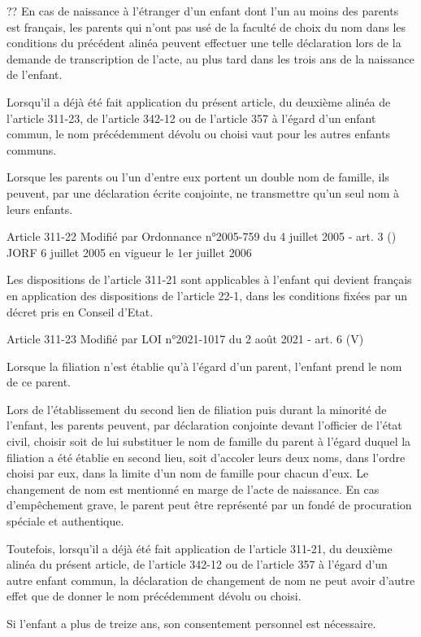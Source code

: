 \documentclass[
  12pt,
]{book}
\begin{document}
\begin{encadre}{??}
En cas de naissance à l'étranger d'un enfant dont l'un au moins des parents est français, les parents qui n'ont pas usé de la faculté de choix du nom dans les conditions du précédent alinéa peuvent effectuer une telle déclaration lors de la demande de transcription de l'acte, au plus tard dans les trois ans de la naissance de l'enfant.

Lorsqu'il a déjà été fait application du présent article, du deuxième alinéa de l'article 311-23, de l'article 342-12 ou de l'article 357 à l'égard d'un enfant commun, le nom précédemment dévolu ou choisi vaut pour les autres enfants communs.

Lorsque les parents ou l'un d'entre eux portent un double nom de famille, ils peuvent, par une déclaration écrite conjointe, ne transmettre qu'un seul nom à leurs enfants.

Article 311-22
Modifié par Ordonnance n°2005-759 du 4 juillet 2005 - art. 3 () JORF 6 juillet 2005 en vigueur le 1er juillet 2006

Les dispositions de l'article 311-21 sont applicables à l'enfant qui devient français en application des dispositions de l'article 22-1, dans les conditions fixées par un décret pris en Conseil d'Etat.

Article 311-23
Modifié par LOI n°2021-1017 du 2 août 2021 - art. 6 (V)

Lorsque la filiation n'est établie qu'à l'égard d'un parent, l'enfant prend le nom de ce parent.

Lors de l'établissement du second lien de filiation puis durant la minorité de l'enfant, les parents peuvent, par déclaration conjointe devant l'officier de l'état civil, choisir soit de lui substituer le nom de famille du parent à l'égard duquel la filiation a été établie en second lieu, soit d'accoler leurs deux noms, dans l'ordre choisi par eux, dans la limite d'un nom de famille pour chacun d'eux. Le changement de nom est mentionné en marge de l'acte de naissance. En cas d'empêchement grave, le parent peut être représenté par un fondé de procuration spéciale et authentique.

Toutefois, lorsqu'il a déjà été fait application de l'article 311-21, du deuxième alinéa du présent article, de l'article 342-12 ou de l'article 357 à l'égard d'un autre enfant commun, la déclaration de changement de nom ne peut avoir d'autre effet que de donner le nom précédemment dévolu ou choisi.

Si l'enfant a plus de treize ans, son consentement personnel est nécessaire.


\end{encadre}
\end{document}
